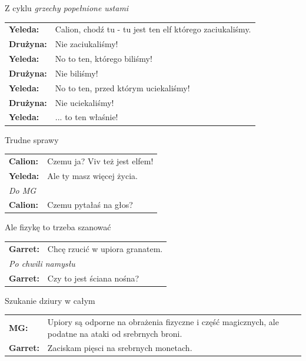 \documentclass[10pt,twoside,twocolumn]{book}
\begin{document}
\begin{rpg-quotebox}{Z cyklu \emph{grzechy popełnione ustami}}
   \begin{tabularx}{\columnwidth}{lX}
      \textbf{Yeleda:} & Calion, chodź tu - tu jest ten elf którego zaciukaliśmy.\\
      \textbf{Drużyna:} & Nie zaciukaliśmy!\\
      \textbf{Yeleda:} & No to ten, którego biliśmy!\\
      \textbf{Drużyna:} & Nie biliśmy!\\
      \textbf{Yeleda:} & No to ten, przed którym uciekaliśmy!\\
      \textbf{Drużyna:} & Nie uciekaliśmy!\\
      \textbf{Yeleda:} & ... to ten właśnie!\\
   \end{tabularx}
\end{rpg-quotebox}

\begin{rpg-quotebox}{Trudne sprawy}
   \begin{tabularx}{\columnwidth}{lX}
      \textbf{Calion:} & Czemu ja? Viv też jest elfem!\\
      \textbf{Yeleda:} & Ale ty masz więcej życia.\\
      \multicolumn{2}{l}{\textit{Do MG}}\\
      \textbf{Calion:} & Czemu pytałaś na głos?\\
   \end{tabularx}
\end{rpg-quotebox}

\begin{rpg-quotebox}{Ale fizykę to trzeba szanować}
   \begin{tabularx}{\columnwidth}{lX}
      \textbf{Garret:} & Chcę rzucić w upiora granatem.\\
      \multicolumn{2}{l}{\textit{Po chwili namysłu}}\\
      \textbf{Garret:} & Czy to jest ściana nośna?\\
   \end{tabularx}
\end{rpg-quotebox}

\begin{rpg-quotebox}{Szukanie dziury w całym}
   \begin{tabularx}{\columnwidth}{lX}
      \textbf{MG:} & Upiory są odporne na obrażenia fizyczne i część magicznych, ale podatne na ataki od srebrnych broni.\\
      \textbf{Garret:} & Zaciskam pięsci na srebrnych monetach.\\
   \end{tabularx}
\end{rpg-quotebox}
\end{document}
